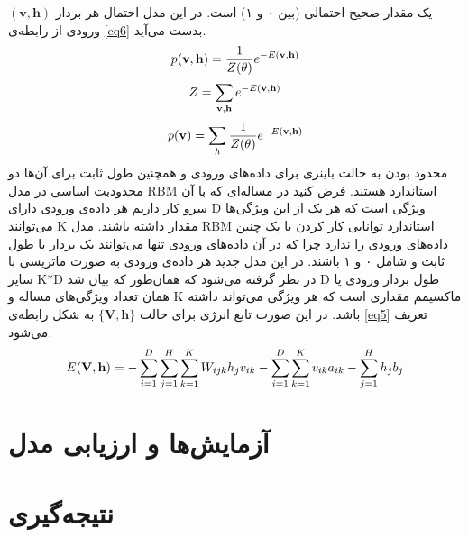 \documentclass[12pt,a4paper]{article}
\begin{document}
$(\textbf{v},\textbf{h})$
یک مقدار صحیح احتمالی‌ (بین ۰ و ۱) است. در این مدل احتمال هر بردار ورودی از رابطه‌ی
\ref{eq6}
بدست می‌‌آید.
\begin{align}
\centering
\label{eq4}
p(\textbf{v},\textbf{h}) = \dfrac{1}{Z(\theta)} e^{-E(\textbf{v},\textbf{h})}
\end{align}
\begin{align}
\centering
\label{eq5}
Z = \sum_{\textbf{v}, \textbf{h}}e^{-E(\textbf{v},\textbf{h})}
\end{align}
\begin{align}
\centering
\label{eq6}
p(\textbf{v}) = \sum_{h} \dfrac{1}{Z(\theta)} e^{-E(\textbf{v},\textbf{h})}
\end{align}
محدود بودن به حالت باینری برای داده‌های ورودی و همچنین طول ثابت برای آن‌ها دو محدودبت اساسی در مدل RBM استاندارد هستند. فرض کنید در مساله‌ای‌ که با آن سرو کار داریم هر داده‌ی ورودی دارای D ویژگی‌ است که هر یک از این ویژگی‌ها می‌‌توانند K مقدار داشته باشند. مدل RBM استاندارد توانایی کار کردن با یک چنین داده‌های ورودی را ندارد چرا که در آن داده‌های ورودی تنها می‌‌توانند یک بردار با طول ثابت و شامل ۰ و ۱ باشند. در این مدل جدید هر داده‌ی ورودی به صورت ماتریسی با سایز K*D در نظر گرفته می‌شود که همان‌طور که بیان شد D طول بردار ورودی یا همان تعداد ویژگی‌های مساله و K ماکسیمم مقداری است که هر ویژگی‌ می‌‌تواند داشته باشد. در این صورت تابع انرژی برای حالت
$\{\textbf{V},\textbf{h}\}$
به شکل رابطه‌ی
\ref{eq5}
تعریف می‌‌شود.
\begin{align}
\centering
\label{eq7}
E(\textbf{V},\textbf{h})=-\sum_{i=1}^{D}\sum_{j=1}^{H}\sum_{k=1}^{K}W_{ijk}h_jv_{ik}-\sum_{i=1}^{D}\sum_{k=1}^{K}v_{ik}a_{ik} - \sum_{j=1}^{H}h_jb_j
\end{align}
	
\section{آزمایش‌ها و ارزیابی مدل}
\section{نتیجه‌گیری}

%
%
\end{document}
